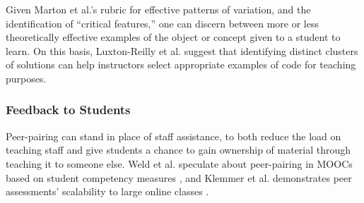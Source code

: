 \documentclass[12pt]{article}
\begin{document}
Given Marton et al.'s rubric for effective patterns of variation, and the identification of ``critical features,'' one can discern between more or less theoretically effective examples of the object or concept given to a student to learn. On this basis, Luxton-Reilly et al. \cite{Luxton13} suggest that identifying distinct clusters of solutions can help instructors select appropriate examples of code for teaching purposes.



%
%
%

\subsubsection{Feedback to Students}

Peer-pairing can stand in place of staff assistance, to both reduce the load on teaching staff and give students a chance to gain ownership of material through teaching it to someone else. Weld et al. speculate about peer-pairing in MOOCs based on student competency measures \cite{WeldHcomp12}, and Klemmer et al. demonstrates peer assessments' scalability to large online classes \cite{Klemmer}.
\end{document}
